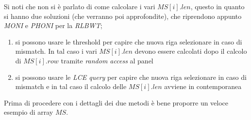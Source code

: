 Si noti che non si è parlato di come calcolare i vari $MS[i].len$, questo in
quanto si hanno due soluzioni (che verranno poi approfondite), che riprendono
appunto \textit{MONI} e \textit{PHONI} per la \textit{RLBWT};
\begin{enumerate}
  \item si possono usare le threshold per capire che nuova riga selezionare in
  caso di mismatch. In tal caso i vari $MS[i].len$ devono essere calcolati dopo
  il calcolo di $MS[i].row$ tramite \textit{random access} al panel
  \item si possono usare le \textit{LCE query} per capire che nuova riga
  selezionare in caso di mismatch e in tal caso il calcolo delle $MS[i].len$
  avviene in contemporanea 
\end{enumerate}
Prima di procedere con i dettagli dei due metodi è bene proporre un veloce
esempio di array $MS$.
